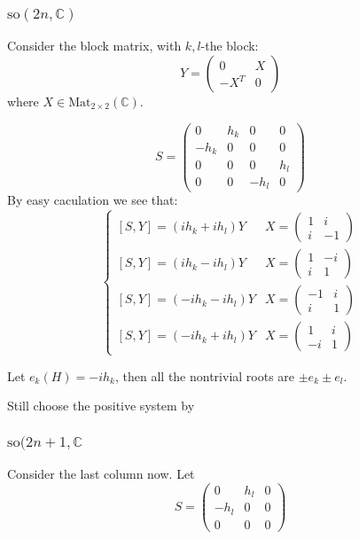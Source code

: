 \documentclass[12pt]{amsart}
\def\Mat{\rm{Mat}}
\def\bC{{\mathbb{C}}}
\def\aso{\mathrm{so}}
\def\Mat{\mathrm{Mat}}
\begin{document}
\subsubsection{$\aso(2n,\bC)$}
Consider the block matrix, with $k,l$-the block:
\[
Y = \begin{pmatrix}
  0  & X \\
  -X^T & 0  
\end{pmatrix}
\]
where $X\in \Mat_{2\times 2}(\bC)$.

\[
S = \begin{pmatrix}
   0 & h_k &   0 & 0 \\
-h_k & 0   &   0 & 0 \\
   0 & 0   &   0 & h_l \\
   0 & 0   & -h_l&  0 
\end{pmatrix}
\]
By easy caculation we see that:
\[
\begin{cases}
[S,Y] = (ih_k+ih_l) Y
& X = \begin{pmatrix}
  1 & i \\
  i & -1
\end{pmatrix} \\
[S,Y] = (ih_k-ih_l) Y
& X = \begin{pmatrix}
  1 & -i \\
  i & 1
\end{pmatrix} \\
[S,Y] = (-ih_k-ih_l) Y
& X = \begin{pmatrix}
  -1 & i \\
  i & 1
\end{pmatrix} \\
[S,Y] = (-ih_k+ih_l) Y
& X = \begin{pmatrix}
   1 & i \\
  -i & 1
\end{pmatrix} 
\end{cases}
\]

Let $e_k(H) = -ih_k$, then all the nontrivial roots are $\pm e_k \pm e_l$.

Still choose the positive system by 
\subsubsection{$\aso(2n+1, \bC$}
Consider the last column now. Let
\[
S = \begin{pmatrix}
  0 & h_l & 0 \\
  -h_l & 0 & 0 \\
  0 & 0 &0 
\end{pmatrix}
\]
\end{document}
